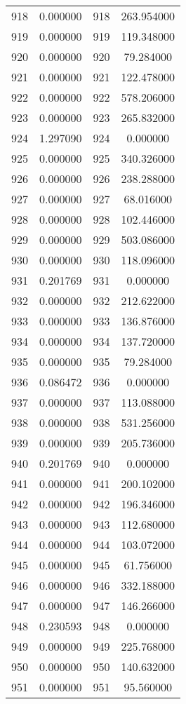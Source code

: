 \documentclass[12pt]{article}
\begin{document}
\begin{longtable}{@{}cccc@{}}
918 & 0.000000 & 918 & 263.954000 \\
919 & 0.000000 & 919 & 119.348000 \\
920 & 0.000000 & 920 & 79.284000 \\
921 & 0.000000 & 921 & 122.478000 \\
922 & 0.000000 & 922 & 578.206000 \\
923 & 0.000000 & 923 & 265.832000 \\
924 & 1.297090 & 924 & 0.000000 \\
925 & 0.000000 & 925 & 340.326000 \\
926 & 0.000000 & 926 & 238.288000 \\
927 & 0.000000 & 927 & 68.016000 \\
928 & 0.000000 & 928 & 102.446000 \\
929 & 0.000000 & 929 & 503.086000 \\
930 & 0.000000 & 930 & 118.096000 \\
931 & 0.201769 & 931 & 0.000000 \\
932 & 0.000000 & 932 & 212.622000 \\
933 & 0.000000 & 933 & 136.876000 \\
934 & 0.000000 & 934 & 137.720000 \\
935 & 0.000000 & 935 & 79.284000 \\
936 & 0.086472 & 936 & 0.000000 \\
937 & 0.000000 & 937 & 113.088000 \\
938 & 0.000000 & 938 & 531.256000 \\
939 & 0.000000 & 939 & 205.736000 \\
940 & 0.201769 & 940 & 0.000000 \\
941 & 0.000000 & 941 & 200.102000 \\
942 & 0.000000 & 942 & 196.346000 \\
943 & 0.000000 & 943 & 112.680000 \\
944 & 0.000000 & 944 & 103.072000 \\
945 & 0.000000 & 945 & 61.756000 \\
946 & 0.000000 & 946 & 332.188000 \\
947 & 0.000000 & 947 & 146.266000 \\
948 & 0.230593 & 948 & 0.000000 \\
949 & 0.000000 & 949 & 225.768000 \\
950 & 0.000000 & 950 & 140.632000 \\
951 & 0.000000 & 951 & 95.560000 \\

\end{longtable}
\end{document}
